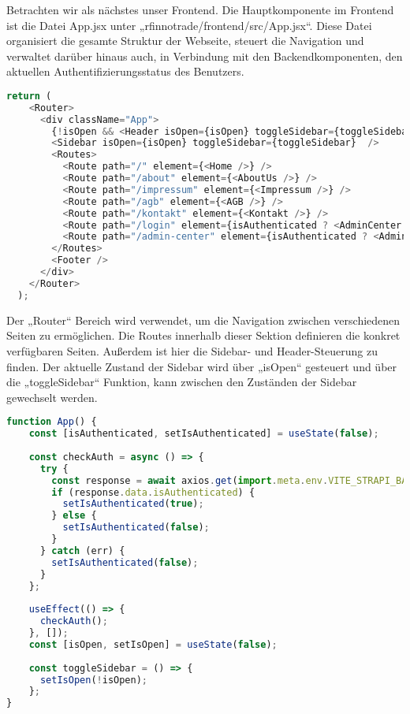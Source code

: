 Betrachten wir als nächstes unser Frontend. Die Hauptkomponente im Frontend ist die Datei App.jsx unter „rfinnotrade/frontend/src/App.jsx“. Diese Datei organisiert die gesamte Struktur der Webseite, steuert die Navigation und verwaltet darüber hinaus auch, in Verbindung mit den Backendkomponenten, den aktuellen Authentifizierungsstatus des Benutzers.

\begin{lstlisting}[language=JavaScript, caption={App.jsx Router}, label={lst:appjsxRouter}]
return (
    <Router>
      <div className="App">
        {!isOpen && <Header isOpen={isOpen} toggleSidebar={toggleSidebar} isAuthenticated={isAuthenticated} setIsAuthenticated={setIsAuthenticated} />}
        <Sidebar isOpen={isOpen} toggleSidebar={toggleSidebar}  />
        <Routes>
          <Route path="/" element={<Home />} />
          <Route path="/about" element={<AboutUs />} />
          <Route path="/impressum" element={<Impressum />} />
          <Route path="/agb" element={<AGB />} />
          <Route path="/kontakt" element={<Kontakt />} />
          <Route path="/login" element={isAuthenticated ? <AdminCenter /> : <Login onLoginSuccess={checkAuth} />} />
          <Route path="/admin-center" element={isAuthenticated ? <AdminCenter /> : <Login onLoginSuccess={checkAuth} />} />
        </Routes>
        <Footer />
      </div>
    </Router>
  );
\end{lstlisting}

Der „Router“ Bereich wird verwendet, um die Navigation zwischen verschiedenen Seiten zu ermöglichen. Die Routes innerhalb dieser Sektion definieren die konkret verfügbaren Seiten.
Außerdem ist hier die Sidebar- und Header-Steuerung zu finden. Der aktuelle Zustand der Sidebar wird über „isOpen“ gesteuert und über die „toggleSidebar“ Funktion, kann zwischen den Zuständen der Sidebar gewechselt werden.

\begin{lstlisting}[language=JavaScript, caption={App.jsx checkAuth}, label={lst:appjsxCheckAuth}]    
function App() {
    const [isAuthenticated, setIsAuthenticated] = useState(false);
  
    const checkAuth = async () => {
      try {
        const response = await axios.get(import.meta.env.VITE_STRAPI_BASE_URL + 'api/auth/status', { withCredentials: true });
        if (response.data.isAuthenticated) {
          setIsAuthenticated(true);
        } else {
          setIsAuthenticated(false);
        }
      } catch (err) {
        setIsAuthenticated(false);
      }
    };
  
    useEffect(() => {
      checkAuth();
    }, []);
    const [isOpen, setIsOpen] = useState(false);
  
    const toggleSidebar = () => {
      setIsOpen(!isOpen);
    };
}

\end{lstlisting}

